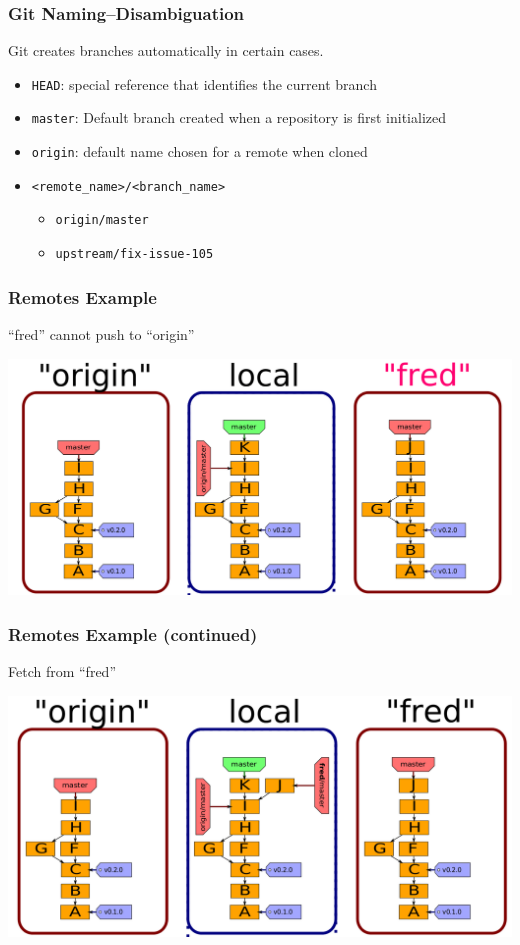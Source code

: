 \documentclass[english,compress]{beamer}
\begin{document}
\begin{frame}[fragile]
    \frametitle{Git Naming--Disambiguation}
    Git creates branches automatically in certain cases.
    \begin{itemize}
        \item \verb|HEAD|: special reference that identifies the current branch
        \item \verb|master|: Default branch created when a repository is first
            initialized
        \item \verb|origin|: default name chosen for a remote when cloned
        \item \verb|<remote_name>/<branch_name>|
            \begin{itemize}
                \item \verb|origin/master|
                \item \verb|upstream/fix-issue-105|
            \end{itemize}
    \end{itemize}
\end{frame}

\begin{frame}[fragile]
    \frametitle{Remotes Example}
	``fred'' cannot push to ``origin''

	\begin{center}
		\includegraphics[width=.8\textwidth]{figs/several-remotes}
	\end{center}
\end{frame}

\begin{frame}[fragile]
    \frametitle{Remotes Example (continued)}
	Fetch from ``fred''

	\begin{center}
		\includegraphics[width=.8\textwidth]{figs/fetch-fred}
	\end{center}
\end{frame}
\end{document}
